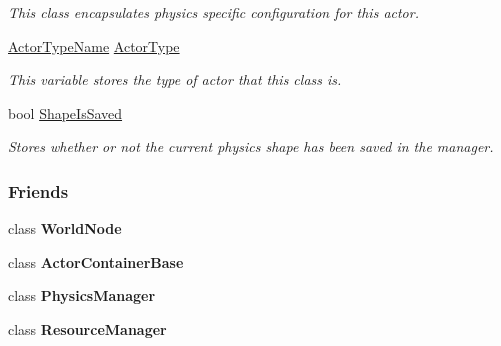\begin{DoxyCompactItemize}
\begin{DoxyCompactList}\small\item\em This class encapsulates physics specific configuration for this actor. \item\end{DoxyCompactList}\item 
\hypertarget{classphys_1_1ActorBase_a42baa3657656300eeefe3ed48f526a00}{
\hyperlink{classphys_1_1ActorBase_aff3a7c464e8ce82576073f8f891434b7}{ActorTypeName} \hyperlink{classphys_1_1ActorBase_a42baa3657656300eeefe3ed48f526a00}{ActorType}}
\label{d8/d0f/classphys_1_1ActorBase_a42baa3657656300eeefe3ed48f526a00}

\begin{DoxyCompactList}\small\item\em This variable stores the type of actor that this class is. \item\end{DoxyCompactList}\item 
\hypertarget{classphys_1_1ActorBase_a22c0ab01bdc3e1e5c656fb0f201f6929}{
bool \hyperlink{classphys_1_1ActorBase_a22c0ab01bdc3e1e5c656fb0f201f6929}{ShapeIsSaved}}
\label{d8/d0f/classphys_1_1ActorBase_a22c0ab01bdc3e1e5c656fb0f201f6929}

\begin{DoxyCompactList}\small\item\em Stores whether or not the current physics shape has been saved in the manager. \item\end{DoxyCompactList}\end{DoxyCompactItemize}
\subsubsection*{Friends}
\begin{DoxyCompactItemize}
\item 
\hypertarget{classphys_1_1ActorBase_a1cacd07efb11226da49a7c80569b18e8}{
class {\bfseries WorldNode}}
\label{d8/d0f/classphys_1_1ActorBase_a1cacd07efb11226da49a7c80569b18e8}

\item 
\hypertarget{classphys_1_1ActorBase_a54042fcfa7ab444a50ec79cbe3395356}{
class {\bfseries ActorContainerBase}}
\label{d8/d0f/classphys_1_1ActorBase_a54042fcfa7ab444a50ec79cbe3395356}

\item 
\hypertarget{classphys_1_1ActorBase_a139cf05ac01161b7071c8a037c841683}{
class {\bfseries PhysicsManager}}
\label{d8/d0f/classphys_1_1ActorBase_a139cf05ac01161b7071c8a037c841683}

\item 
\hypertarget{classphys_1_1ActorBase_a54c1252abc87a78a301e6b6984470408}{
class {\bfseries ResourceManager}}
\label{d8/d0f/classphys_1_1ActorBase_a54c1252abc87a78a301e6b6984470408}

\end{DoxyCompactItemize}



